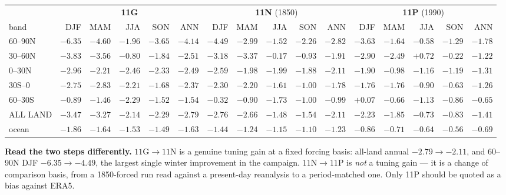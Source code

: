 \documentclass[10pt]{article}
\begin{document}
\begin{center}\footnotesize
\begin{tabular}{lrrrrr@{\hskip 14pt}rrrrr@{\hskip 14pt}rrrrr}
\toprule
& \multicolumn{5}{c}{\textbf{11G}} & \multicolumn{5}{c}{\textbf{11N} (1850)} & \multicolumn{5}{c}{\textbf{11P} (1990)} \\
\cmidrule(lr){2-6}\cmidrule(lr){7-11}\cmidrule(lr){12-16}
band & DJF & MAM & JJA & SON & ANN & DJF & MAM & JJA & SON & ANN & DJF & MAM & JJA & SON & ANN \\
\midrule
60--90N   & $-6.35$ & $-4.60$ & $-1.96$ & $-3.65$ & $-4.14$ & $-4.49$ & $-2.99$ & $-1.52$ & $-2.26$ & $-2.82$ & $-3.63$ & $-1.64$ & $-0.58$ & $-1.29$ & $-1.78$ \\
30--60N   & $-3.83$ & $-3.56$ & $-0.80$ & $-1.84$ & $-2.51$ & $-3.18$ & $-3.37$ & $-0.17$ & $-0.93$ & $-1.91$ & $-2.90$ & $-2.49$ & $+0.72$ & $-0.22$ & $-1.22$ \\
0--30N    & $-2.96$ & $-2.21$ & $-2.46$ & $-2.33$ & $-2.49$ & $-2.59$ & $-1.98$ & $-1.99$ & $-1.88$ & $-2.11$ & $-1.90$ & $-0.98$ & $-1.16$ & $-1.19$ & $-1.31$ \\
30S--0    & $-2.75$ & $-2.83$ & $-2.21$ & $-1.68$ & $-2.37$ & $-2.30$ & $-2.20$ & $-1.61$ & $-1.00$ & $-1.78$ & $-1.76$ & $-1.76$ & $-0.90$ & $-0.63$ & $-1.26$ \\
60--30S   & $-0.89$ & $-1.46$ & $-2.29$ & $-1.52$ & $-1.54$ & $-0.32$ & $-0.90$ & $-1.73$ & $-1.00$ & $-0.99$ & $+0.07$ & $-0.66$ & $-1.13$ & $-0.86$ & $-0.65$ \\
\midrule
ALL LAND  & $-3.47$ & $-3.27$ & $-2.14$ & $-2.29$ & $-2.79$ & $-2.76$ & $-2.66$ & $-1.48$ & $-1.54$ & $-2.11$ & $-2.23$ & $-1.85$ & $-0.73$ & $-0.83$ & $-1.41$ \\
ocean     & $-1.86$ & $-1.64$ & $-1.53$ & $-1.49$ & $-1.63$ & $-1.44$ & $-1.24$ & $-1.15$ & $-1.10$ & $-1.23$ & $-0.86$ & $-0.71$ & $-0.64$ & $-0.56$ & $-0.69$ \\
\bottomrule
\end{tabular}
\end{center}

\textbf{Read the two steps differently.} $11\text{G}\to11\text{N}$ is a genuine tuning
gain at a fixed forcing basis: all-land annual $-2.79\to-2.11$, and 60--90N DJF
$-6.35\to-4.49$, the largest single winter improvement in the campaign. $11\text{N}\to
11\text{P}$ is \emph{not} a tuning gain --- it is a change of comparison basis, from a
1850-forced run read against a present-day reanalysis to a period-matched one. Only 11P
should be quoted as a bias against ERA5.
\end{document}
